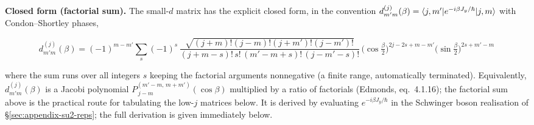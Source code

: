 \medskip\noindent\textbf{Closed form (factorial sum).} The small-$d$ matrix has the explicit closed form, in the convention $d^{(j)}_{m'm}(\beta)=\braket{j,m'|e^{-i\beta J_{y}/\hbar}|j,m}$ with Condon--Shortley phases,
\begin{linenomath}
\begin{equation}
\boxed{\;
d^{(j)}_{m'm}(\beta)=(-1)^{m-m'}\sum_{s}(-1)^{s}\,
\frac{\sqrt{(j+m)!(j-m)!(j+m')!(j-m')!}}{(j+m-s)!\,s!\,(m'-m+s)!\,(j-m'-s)!}\,
\bigl(\cos\tfrac{\beta}{2}\bigr)^{\!2j-2s+m-m'}\!
\bigl(\sin\tfrac{\beta}{2}\bigr)^{\!2s+m'-m}\;}
\label{eq:d-jacobi-sum}
\end{equation}
\end{linenomath}
where the sum runs over all integers $s$ keeping the factorial arguments nonnegative (a finite range, automatically terminated). Equivalently, $d^{(j)}_{m'm}(\beta)$ is a Jacobi polynomial $P_{\,j-m}^{(m'-m,\,m+m')}(\cos\beta)$ multiplied by a ratio of factorials (Edmonds, eq.~4.1.16); the factorial sum above is the practical route for tabulating the low-$j$ matrices below. It is derived by evaluating $e^{-i\beta J_{y}/\hbar}$ in the Schwinger boson realisation of \S\ref{sec:appendix-su2-reps}; the full derivation is given immediately below.

